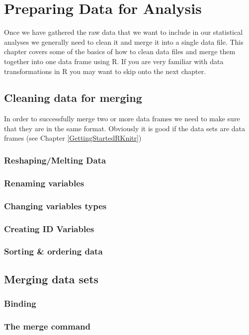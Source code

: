 



\chapter{Preparing Data for Analysis}\label{DataClean}

Once we have gathered the raw data that we want to include in our statistical analyses we generally need to clean it and merge it into a single data file. This chapter covers some of the basics of how to clean data files and merge them together into one data frame using R. If you are very familiar with data transformations in R you may want to skip onto the next chapter. 

\section{Cleaning data for merging}

In order to successfully merge two or more data frames we need to make sure that they are in the same format. Obviously it is good if the data sets are data frames (see Chapter \ref{GettingStartedRKnitr}) 

\subsection{Reshaping/Melting Data}

\subsection{Renaming variables}

\subsection{Changing variables types}

\subsection{Creating ID Variables}

\subsection{Sorting \& ordering data}

\section{Merging data sets}

\subsection{Binding}

\subsection{The merge command}
